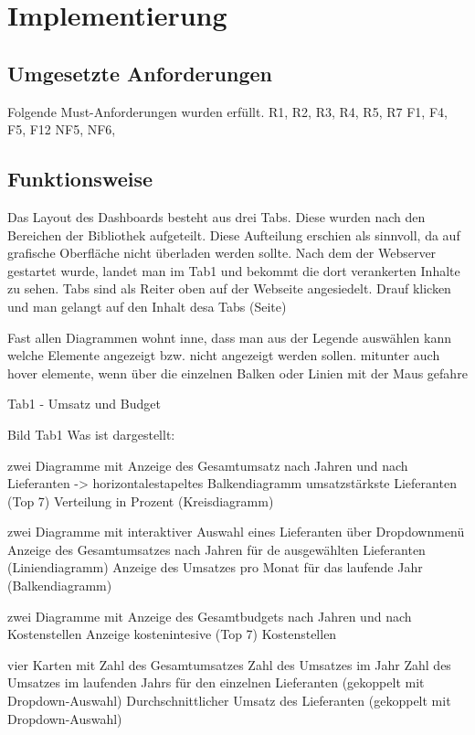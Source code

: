     

\section{Implementierung}

  

    \subsection{Umgesetzte Anforderungen}
    Folgende Must-Anforderungen wurden erfüllt.
    R1, R2, R3, R4, R5, R7
    F1, F4, F5, F12
    NF5, NF6, 
    \subsection{Funktionsweise}
    Das Layout des Dashboards besteht aus drei Tabs. Diese wurden nach den Bereichen der Bibliothek aufgeteilt. Diese Aufteilung erschien als sinnvoll,
    da auf grafische Oberfläche nicht überladen werden sollte.
    Nach dem der Webserver gestartet wurde, landet man im Tab1 und bekommt die dort verankerten Inhalte zu sehen.
    Tabs sind als Reiter oben auf der Webseite angesiedelt.
    Drauf klicken und man gelangt auf den Inhalt desa Tabs (Seite)
    
    Fast allen Diagrammen wohnt inne, dass man aus der Legende auswählen kann welche Elemente angezeigt bzw. nicht angezeigt werden sollen.
    mitunter auch hover elemente, wenn über die einzelnen Balken oder Linien mit der Maus gefahre 
    
    Tab1 - Umsatz und Budget
    
    Bild Tab1
    Was ist dargestellt:
    
    zwei Diagramme mit 
        Anzeige des Gesamtumsatz nach Jahren und nach Lieferanten ->  horizontalestapeltes Balkendiagramm
        umsatzstärkste Lieferanten (Top 7) Verteilung in Prozent (Kreisdiagramm)
        
    zwei Diagramme mit interaktiver Auswahl eines Lieferanten über Dropdownmenü
        Anzeige des Gesamtumsatzes nach Jahren für de ausgewählten Lieferanten (Liniendiagramm)
        Anzeige des Umsatzes pro Monat für das laufende Jahr (Balkendiagramm)
    
    zwei Diagramme mit
        Anzeige des Gesamtbudgets nach Jahren und nach Kostenstellen 
        Anzeige kostenintesive (Top 7) Kostenstellen
        
    
    vier Karten mit
        Zahl des Gesamtumsatzes
        Zahl des Umsatzes im Jahr
        Zahl des Umsatzes im laufenden Jahrs für den einzelnen Lieferanten (gekoppelt mit Dropdown-Auswahl)
        Durchschnittlicher Umsatz des Lieferanten (gekoppelt mit Dropdown-Auswahl)
    
